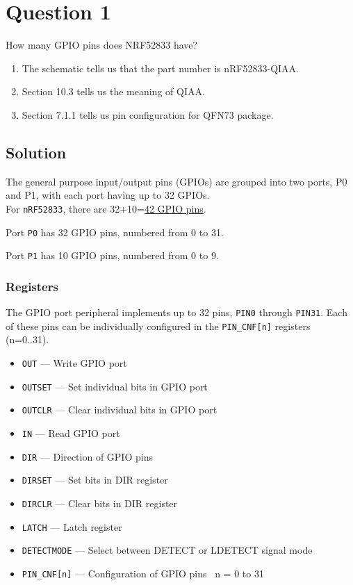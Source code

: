 \section*{Question 1}

How many GPIO pins does NRF52833 have?
\begin{enumerate}[label= (\alph*)]
    \item The schematic tells us that the part number is nRF52833-QIAA.\@
    \item Section 10.3 tells us the meaning of QIAA.\@
    \item Section 7.1.1 tells us pin configuration for QFN73 package.
\end{enumerate}

\subsection*{Solution}

The general purpose input/output pins (GPIOs) are grouped into two ports, P0 and P1, with each port having up to 32 GPIOs.\\
For \texttt{nRF52833}, there are 32+10=\underline{42 GPIO pins}.

Port \texttt{P0} has 32 GPIO pins, numbered from 0 to 31.

Port \texttt{P1} has 10 GPIO pins, numbered from 0 to 9.

\subsubsection*{Registers}

The GPIO port peripheral implements up to 32 pins, \texttt{PIN0} through \texttt{PIN31}.
Each of these pins can be individually configured in the \texttt{PIN\_CNF[n]} registers (n=0..31).

\begin{itemize}
    \item \texttt{OUT} --- Write GPIO port
    \item \texttt{OUTSET} --- Set individual bits in GPIO port
    \item \texttt{OUTCLR} --- Clear individual bits in GPIO port
    \item \texttt{IN} --- Read GPIO port
    \item \texttt{DIR} --- Direction of GPIO pins
    \item \texttt{DIRSET} --- Set bits in DIR register
    \item \texttt{DIRCLR} --- Clear bits in DIR register
    \item \texttt{LATCH} --- Latch register
    \item \texttt{DETECTMODE} --- Select between DETECT or LDETECT signal mode
    \item \texttt{PIN\_CNF[n]} --- Configuration of GPIO pins
          \subitem~n = 0 to 31
\end{itemize}

